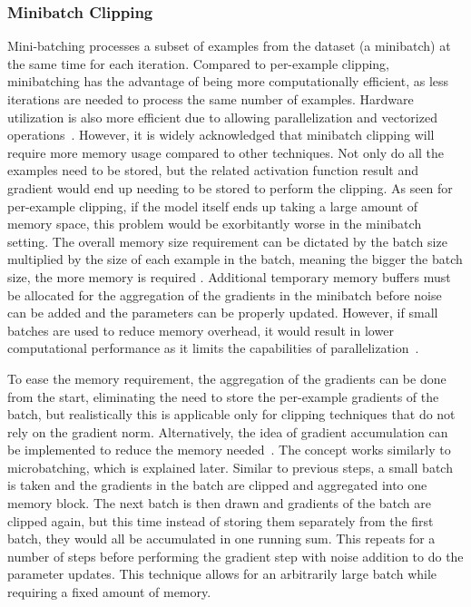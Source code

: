 \subsubsection{Minibatch Clipping}

Mini-batching processes a subset of examples from the dataset (a minibatch) at the same time for each iteration. Compared to per-example clipping, minibatching has the advantage of being more computationally efficient, as less iterations are needed to process the same number of examples. Hardware utilization is also more efficient due to allowing parallelization and vectorized operations~\cite{RefWorks:RefID:55-leescaling}. However, it is widely acknowledged that minibatch clipping will require more memory usage compared to other techniques. Not only do all the examples need to be stored, but the related activation function result and gradient would end up needing to be stored to perform the clipping. As seen for per-example clipping, if the model itself ends up taking a large amount of memory space, this problem would be exorbitantly worse in the minibatch setting. The overall memory size requirement can be dictated by the batch size multiplied by the size of each example in the batch, meaning the bigger the batch size, the more memory is required \cite{RefWorks:RefID:51-yousefpouropacus:}.  Additional temporary memory buffers must be allocated for the aggregation of the gradients in the minibatch before noise can be added and the parameters can be properly updated. However, if small batches are used to reduce memory overhead, it would result in lower computational performance as it limits the capabilities of parallelization~\cite{RefWorks:RefID:58-shirish2017large-batch}.

To ease the memory requirement, the aggregation of the gradients can be done from the start, eliminating the need to store the per-example gradients of the batch, but realistically this is applicable only for clipping techniques that do not rely on the gradient norm. Alternatively, the idea of gradient accumulation can be implemented to reduce the memory needed~\cite{RefWorks:RefID:46-ponomareva2023dp-fy}. The concept works similarly to microbatching, which is explained later. Similar to previous steps, a small batch is taken and the gradients in the batch are clipped and aggregated into one memory block. The next batch is then drawn and gradients of the batch are clipped again, but this time instead of storing them separately from the first batch, they would all be accumulated in one running sum. This repeats for a number of steps before performing the gradient step with noise addition to do the parameter updates. This technique allows for an arbitrarily large batch while requiring a fixed amount of memory.

